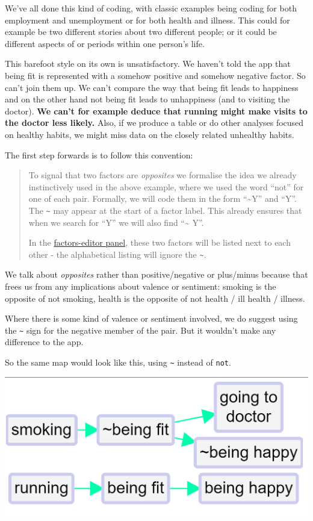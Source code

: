 \documentclass[
]{book}
\begin{document}
We've all done this kind of coding, with classic examples being coding for both employment and unemployment or for both health and illness. This could for example be two different stories about two different people; or it could be different aspects of or periods within one person's life.

This barefoot style on its own is unsatisfactory. We haven't told the app that being fit is represented with a somehow positive and somehow negative factor. So can't join them up. We can't compare the way that being fit leads to happiness and on the other hand not being fit leads to unhappiness (and to visiting the doctor). \textbf{We can't for example deduce that running might make visits to the doctor less likely.} Also, if we produce a table or do other analyses focused on healthy habits, we might miss data on the closely related unhealthy habits.

The first step forwards is to follow this convention:

\begin{quote}
To signal that two factors are \emph{opposites} we formalise the idea we already instinctively used in the above example, where we used the word ``not'' for one of each pair. Formally, we will code them in the form ``\textasciitilde Y'' and ``Y''. The \texttt{\textasciitilde{}} may appear at the start of a factor label. This already ensures that when we search for ``Y'' we will also find ``\textasciitilde{} Y''.

In the \protect\hyperlink{xfactor-editor}{factors-editor panel}, these two factors will be listed next to each other - the alphabetical listing will ignore the \texttt{\textasciitilde{}}.
\end{quote}

We talk about \emph{opposites} rather than positive/negative or plus/minus because that frees us from any implications about valence or sentiment: smoking is the opposite of not smoking, health is the opposite of not health / ill health / illness.

Where there is some kind of valence or sentiment involved, we do suggest using the \texttt{\textasciitilde{}} sign for the negative member of the pair. But it wouldn't make any difference to the app.

So the same map would look like this, using \texttt{\textasciitilde{}} instead of \texttt{not}.

\includegraphics[width=6.77083in,height=\textheight]{_assets/121007.png}
\end{document}
